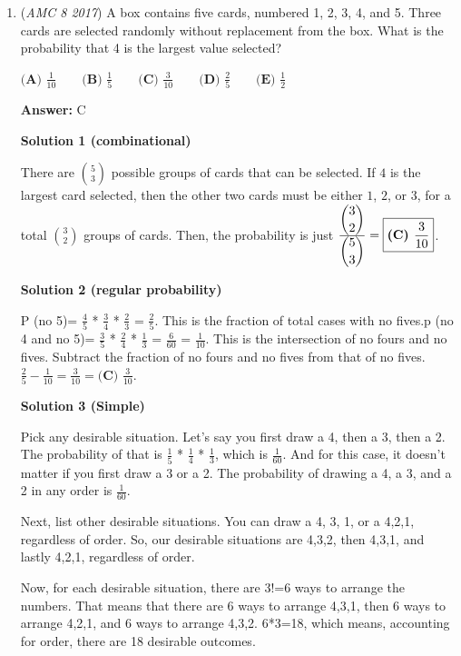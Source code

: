 \begin{enumerate}
 


	\item (\textit{AMC 8 2017}) A box contains five cards, numbered 1, 2, 3, 4, and 5. Three cards are selected randomly without replacement from the box. What is the probability that 4 is the largest value selected?


 $\textbf{(A) }\frac{1}{10}\qquad\textbf{(B) }\frac{1}{5}\qquad\textbf{(C) }\frac{3}{10}\qquad\textbf{(D) }\frac{2}{5}\qquad\textbf{(E) }\frac{1}{2}$

 \textbf{Answer: }C



\textbf{Solution 1 (combinational)}

There are $\binom{5}{3}$ possible groups of cards that can be selected. If $4$ is the largest card selected, then the other two cards must be either $1$, $2$, or $3$, for a total $\binom{3}{2}$ groups of cards. Then, the probability is just ${\frac{{\dbinom{3}{2}}}{{\dbinom{5}{3}}}} = \boxed{{\textbf{(C) }} {\frac{3}{10}}}$.

 



\textbf{Solution 2 (regular probability)}

P (no 5)= $\frac{4}{5}$ * $\frac{3}{4}$ * $\frac{2}{3}$ = $\frac{2}{5}$. This is the fraction of total cases with no fives.p (no 4 and no 5)= $\frac{3}{5}$ * $\frac{2}{4}$ * $\frac{1}{3}$ = $\frac{6}{60}$ = $\frac{1}{10}$. This is the intersection of no fours and no fives. Subtract the fraction of no fours and no fives from that of no fives. $\frac{2}{5} - \frac{1}{10} = \frac{3}{10} = \boxed{{\textbf{(C) }} {\frac{3}{10}}}$.

 



\textbf{Solution 3 (Simple)}

Pick any desirable situation. Let's say you first draw a 4, then a 3, then a 2. The probability of that is $\frac{1}{5}$ * $\frac{1}{4}$ * $\frac{1}{3}$, which is $\frac{1}{60}$. And for this case, it doesn't matter if you first draw a 3 or a 2. The probability of drawing a 4, a 3, and a 2 in any order is $\frac{1}{60}$. 

 Next, list other desirable situations. You can draw a 4, 3, 1, or a 4,2,1, regardless of order. So, our desirable situations are 4,3,2, then 4,3,1, and lastly 4,2,1, regardless of order.

 Now, for each desirable situation, there are 3!=6 ways to arrange the numbers. That means that there are 6 ways to arrange 4,3,1, then 6 ways to arrange 4,2,1, and 6 ways to arrange 4,3,2. 6*3=18, which means, accounting for order, there are 18 desirable outcomes. 


\end{enumerate}
